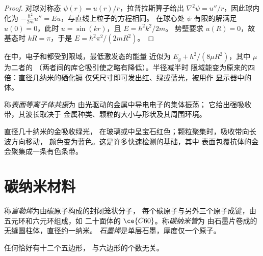 \begin{proof}
对球对称态 $\psi(r) = u(r)/r$，拉普拉斯算子给出
$\nabla^2\psi = u''/r$，因此球内化为 $-\frac{\hbar^2}{2m}u'' = Eu$，与直线上粒子的方程相同。
在球心处 $\psi$ 有限的解满足 $u(0) = 0$，此时 $u = \sin(kr)$，且 $E = \hbar^2k^2/2m$。
势壁要求 $u(R) = 0$，故基态时 $kR = \pi$，于是 $E = \hbar^2\pi^2/(2mR^2)$。
\end{proof}

在中，电子和都受到限域，最低激发态的能量
近似为 $E_g + h^2/(8\mu R^2)$，其中 $\mu$ 为二者的
（两者间的库仑吸引使之略有降低）。半径减半时
限域能变为原来的四倍：直径几纳米的硒化镉
仅凭尺寸即可发出红、绿或蓝光，被用作
显示器中的体。

\begin{definition}[表面等离子体共振]\label{def:b3:inorganic-materials:plasmon}
称\emph{表面等离子体共振}为
由光驱动的金属中导电电子的集体振荡；
它给出强吸收带，其波长取决于
金属种类、颗粒的大小与形状及其周围环境。
\end{definition}

直径几十纳米的金吸收绿光，
在玻璃或中呈宝石红色；颗粒聚集时，吸收带向长波方向移动，
颜色变为蓝色。这是许多快速检测的基础，其中
表面包覆抗体的金会聚集成一条有色条带。

\section{碳纳米材料}

\begin{definition}[碳纳米材料]\label{def:b3:inorganic-materials:carbon}
称\emph{富勒烯}为由碳原子构成的封闭笼状分子，
每个碳原子与另外三个原子成键，由五元环和六元环组成，如
二十面体的 $\ce{C60}$。称\emph{碳纳米管}为
由石墨片卷成的无缝圆柱体，直径约一纳米。
\emph{石墨烯}是单层石墨，厚度仅一个原子。
\end{definition}

\begin{proposition}[十二个五边形]\label{prop:b3:inorganic-materials:euler}
任何恰好有十二个五边形，
与六边形的个数无关。
\end{proposition}

